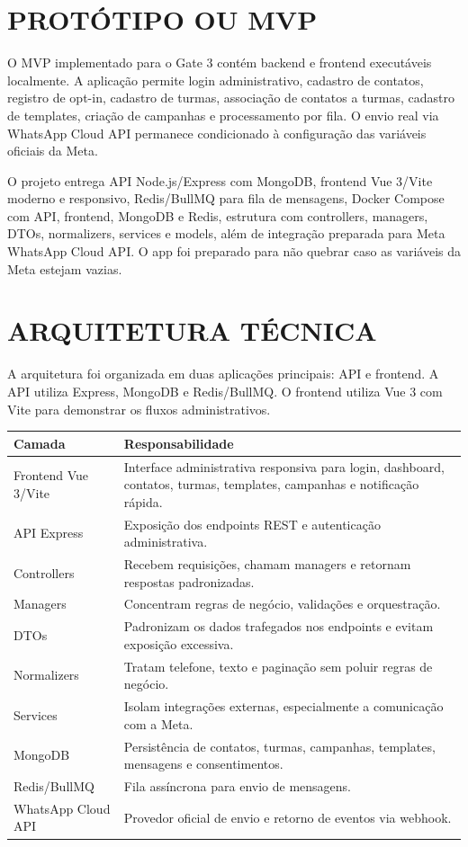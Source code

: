 \documentclass[12pt,letterpaper,oneside]{report}
\begin{document}
\section{PROTÓTIPO OU MVP}

O MVP implementado para o Gate 3 contém backend e frontend executáveis localmente. A aplicação permite login administrativo, cadastro de contatos, registro de opt-in, cadastro de turmas, associação de contatos a turmas, cadastro de templates, criação de campanhas e processamento por fila. O envio real via WhatsApp Cloud API permanece condicionado à configuração das variáveis oficiais da Meta.

O projeto entrega API Node.js/Express com MongoDB, frontend Vue 3/Vite moderno e responsivo, Redis/BullMQ para fila de mensagens, Docker Compose com API, frontend, MongoDB e Redis, estrutura com controllers, managers, DTOs, normalizers, services e models, além de integração preparada para Meta WhatsApp Cloud API. O app foi preparado para não quebrar caso as variáveis da Meta estejam vazias.

\section{ARQUITETURA TÉCNICA}

A arquitetura foi organizada em duas aplicações principais: API e frontend. A API utiliza Express, MongoDB e Redis/BullMQ. O frontend utiliza Vue 3 com Vite para demonstrar os fluxos administrativos.

\begin{quadro}[H]
\centering
\caption{Arquitetura geral da aplicação}
\vspace{0.3cm}
\begin{tabular}{|p{4cm}|p{9cm}|}
\hline
\textbf{Camada} & \textbf{Responsabilidade}\\
\hline
Frontend Vue 3/Vite & Interface administrativa responsiva para login, dashboard, contatos, turmas, templates, campanhas e notificação rápida.\\
\hline
API Express & Exposição dos endpoints REST e autenticação administrativa.\\
\hline
Controllers & Recebem requisições, chamam managers e retornam respostas padronizadas.\\
\hline
Managers & Concentram regras de negócio, validações e orquestração.\\
\hline
DTOs & Padronizam os dados trafegados nos endpoints e evitam exposição excessiva.\\
\hline
Normalizers & Tratam telefone, texto e paginação sem poluir regras de negócio.\\
\hline
Services & Isolam integrações externas, especialmente a comunicação com a Meta.\\
\hline
MongoDB & Persistência de contatos, turmas, campanhas, templates, mensagens e consentimentos.\\
\hline
Redis/BullMQ & Fila assíncrona para envio de mensagens.\\
\hline
WhatsApp Cloud API & Provedor oficial de envio e retorno de eventos via webhook.\\
\hline
\end{tabular}
\end{quadro}
\end{document}

